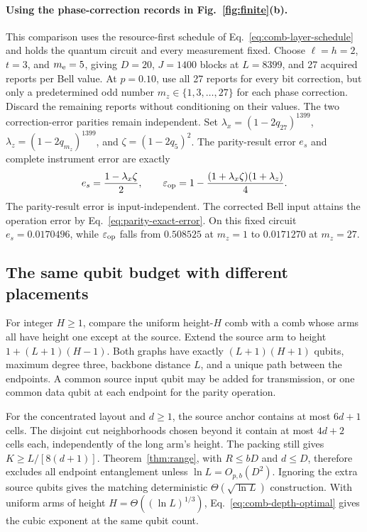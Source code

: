 \documentclass[aps,prl,twocolumn,superscriptaddress,longbibliography,reprint,floatfix]{revtex4-2}
\newcommand{\eps}{\varepsilon}
\begin{document}
\paragraph*{Using the phase-correction records in Fig.~\ref{fig:finite}(b).}
This comparison uses the resource-first schedule of
Eq.~\eqref{eq:comb-layer-schedule} and holds the quantum circuit and
every measurement fixed. Choose $\ell=h=2$, $t=3$, and $m_{\rm e}=5$, giving $D=20$,
$J=1400$ blocks at $L=8399$, and 27 acquired reports per Bell value.
At $p=0.10$, use all 27 reports for every bit correction, but only a
predetermined odd number $m_z\in\{1,3,\ldots,27\}$ for each phase
correction. Discard the remaining reports without conditioning on
their values. The two correction-error parities remain independent.
Set $\lambda_x=(1-2q_{27})^{1399}$,
$\lambda_z=(1-2q_{m_z})^{1399}$, and
$\zeta=(1-2q_5)^2$. The parity-result error $e_s$ and complete
instrument error are exactly
\begin{equation}
 e_s=\frac{1-\lambda_x\zeta}{2},\qquad
 \eps_{\rm op}=1-\frac{(1+\lambda_x\zeta)(1+\lambda_z)}4.
 \label{eq:partial-record-error}
\end{equation}
The parity-result error is input-independent. The corrected Bell input
attains the operation error by Eq.~\eqref{eq:parity-exact-error}. On this
fixed circuit $e_s=0.0170496$, while $\eps_{\rm op}$ falls from
$0.508525$ at $m_z=1$ to $0.0171270$ at $m_z=27$.

\subsection{The same qubit budget with different placements}
\label{sec:equal-budget}
For integer $H\ge1$, compare the uniform height-$H$ comb with a comb
whose arms all have height one except at the source. Extend the source
arm to height $1+(L+1)(H-1)$. Both graphs have exactly
$(L+1)(H+1)$ qubits, maximum degree three, backbone distance $L$,
and a unique path between the endpoints. A common source input qubit
may be added for transmission, or one common data qubit at each endpoint
for the parity operation.

For the concentrated layout and $d\ge1$, the source anchor contains
at most $6d+1$ cells. The disjoint cut neighborhoods chosen beyond it
contain at most $4d+2$ cells each, independently of the long arm's
height. The packing still gives $K\ge L/[8(d+1)]$.
Theorem~\ref{thm:range}, with $R\le bD$ and $d\le D$, therefore excludes
all endpoint entanglement unless $\ln L=O_{p,b}(D^2)$.
Ignoring the extra source qubits gives the matching deterministic
$\Theta(\sqrt{\ln L})$ construction. With uniform arms of height $H=\Theta((\ln L)^{1/3})$,
Eq.~\eqref{eq:comb-depth-optimal} gives the cubic exponent at the same
qubit count.
\end{document}
